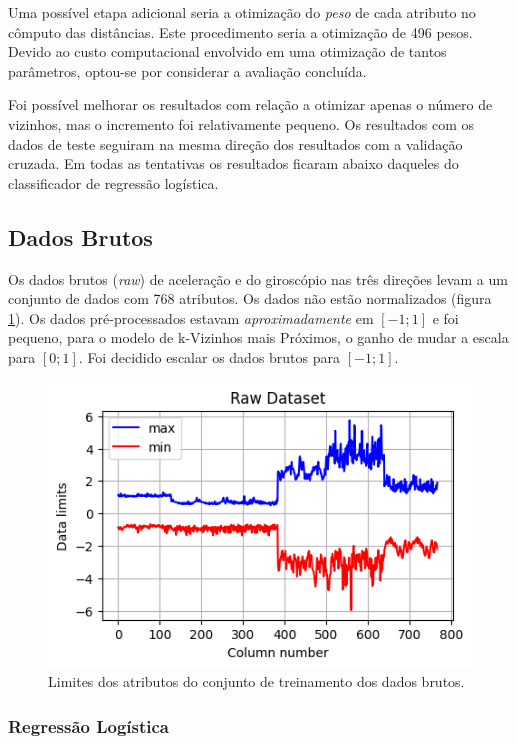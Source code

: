 \documentclass[final,5p]{elsarticle}
\numberwithin{equation}{section}
\begin{document}
        Uma possível etapa adicional seria a otimização do \emph{peso} de cada atributo no cômputo das distâncias. Este procedimento seria a otimização de 496 pesos. Devido ao custo computacional envolvido em uma otimização de tantos parâmetros, optou-se por considerar a avaliação concluída.

        Foi possível melhorar os resultados com relação a otimizar apenas o número de vizinhos, mas o incremento foi relativamente pequeno. Os resultados com os dados de teste seguiram na mesma direção dos resultados com a validação cruzada. Em todas as tentativas os resultados ficaram abaixo daqueles do classificador de regressão logística.

    \subsection{Dados Brutos}

        Os dados brutos (\emph{raw}) de aceleração e do giroscópio nas três direções levam a um conjunto de dados com 768 atributos. Os dados não estão normalizados (figura \ref{fig:dados_brutos}). Os dados pré-processados estavam \emph{aproximadamente} em $[-1;1]$ e foi pequeno, para o modelo de k-Vizinhos mais Próximos, o ganho de mudar a escala para $[0;1]$. Foi decidido escalar os dados brutos para $[-1;1]$.

        \begin{figure}[hbt!]
            \includegraphics[width=0.95\columnwidth]{B_Dataset_Scale.png}
            \caption{Limites dos atributos do conjunto de treinamento dos dados brutos.}
            \label{fig:dados_brutos}
        \end{figure}

    \subsubsection{Regressão Logística}
\end{document}
